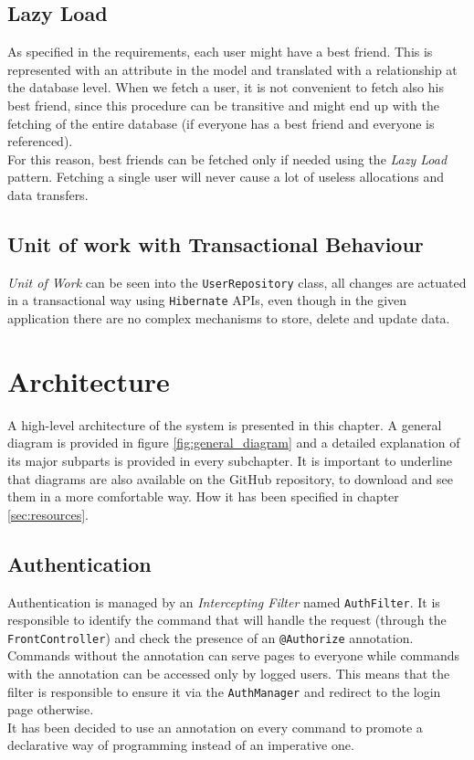 \documentclass[a4paper]{report}
\begin{document}
	\section{Lazy Load}
	\label{sec:lazy_load}
	
	As specified in the requirements, each user might have a best friend. This is represented with an attribute in the model and translated with a relationship at the database level. When we fetch a user, it is not convenient to fetch also his best friend, since this procedure can be transitive and might end up with the fetching of the entire database (if everyone has a best friend and everyone is referenced).\\
	For this reason, best friends can be fetched only if needed using the \textit{Lazy Load} pattern. Fetching a single user will never cause a lot of useless allocations and data transfers.
	
	\section{Unit of work with Transactional Behaviour}
	\label{sec:unit_of_work_transactional}
	
	\textit{Unit of Work} can be seen into the \texttt{UserRepository} class, all changes are actuated in a transactional way using \texttt{Hibernate} APIs, even though in the given application there are no complex mechanisms to store, delete and update data.
	
	\chapter{Architecture}
	\label{cap:architecture}
	
	A high-level architecture of the system is presented in this chapter. A general diagram is provided in figure \ref{fig:general_diagram} and a detailed explanation of its major subparts is provided in every subchapter. It is important to underline that diagrams are also available on the GitHub repository, to download and see them in a more comfortable way. How it has been specified in chapter \ref{sec:resources}.
	
	\section{Authentication}
	\label{sec:authentication}
	
	Authentication is managed by an \textit{Intercepting Filter} named \texttt{AuthFilter}. It is responsible to identify the command that will handle the request (through the \texttt{FrontController}) and check the presence of an \texttt{@Authorize} annotation. Commands without the annotation can serve pages to everyone while commands with the annotation can be accessed only by logged users. This means that the filter is responsible to ensure it via the \texttt{AuthManager} and redirect to the login page otherwise.\\
	It has been decided to use an annotation on every command to promote a declarative way of programming instead of an imperative one.
	
\end{document}
